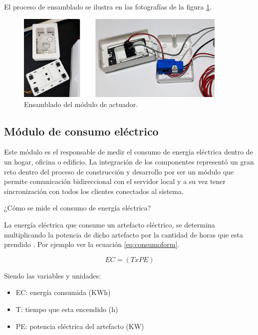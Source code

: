 El proceso de ensamblado se ilustra en las fotografías de la figura \ref{fig:armadoactuador}.



\begin{figure}[htpb]
\centering 
\includegraphics[width=0.9\textwidth]{./Figures/armadoactuador.jpg}
\caption{Ensamblado del módulo de actuador. }
\label{fig:armadoactuador}
\end{figure}


\subsection{Módulo de consumo eléctrico}

Este módulo es el responsable de medir el consumo de energía eléctrica dentro de un hogar, oficina o edificio. La integración de los componentes representó un gran reto dentro del proceso de construcción y desarrollo por ser un módulo que permite comunicación bidireccional con el servidor local y a su vez tener sincronización con todos los clientes conectados al sistema.

\vspace{2cm}

¿Cómo se mide el consumo de energía eléctrica?

La energía eléctrica que consume un artefacto eléctrico, se determina multiplicando la potencia de dicho artefacto por la cantidad de horas que esta prendido \citep{BOOK:3}. Por ejemplo ver la ecuación \ref{eq:consumoform}.

\begin{equation}
	\label{eq:consumoform}
	EC = \left( T x PE \right)
\end{equation}

\vspace{0.2cm}
Siendo las variables y unidades:
\begin{itemize}
\item EC: energía consumida (KWh)
\item T: tiempo que esta encendido (h)
\item PE: potencia eléctrica del artefacto (KW)
\end{itemize}

